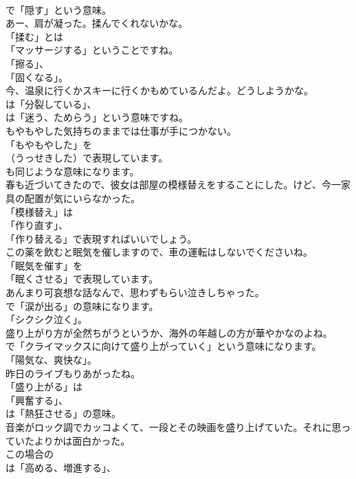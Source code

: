 \documentclass[8pt]{extreport}
\begin{document}
\begin{CJK}{UTF8}{min}
\\	で「隠す」という意味。	
\\	あー、肩が凝った。揉んでくれないかな。 
\\	「揉む」とは
\\	「マッサージする」ということですね。
\\	「擦る」、
\\	「固くなる」。	
\\	今、温泉に行くかスキーに行くかもめているんだよ。どうしようかな。 
\\	は「分裂している」、
\\	は「迷う、ためらう」という意味ですね。	
\\	もやもやした気持ちのままでは仕事が手につかない。 
\\	「もやもやした」を 
\\	（うっせきした）で表現しています。
\\	も同じような意味になります。	
\\	春も近づいてきたので、彼女は部屋の模様替えをすることにした。けど、今一家具の配置が気にいらなかった。 
\\	「模様替え」は
\\	「作り直す」、
\\	「作り替える」で表現すればいいでしょう。	
\\	この薬を飲むと眠気を催しますので、車の運転はしないでくださいね。 
\\	「眠気を催す」を
\\	「眠くさせる」で表現しています。	
\\	あんまり可哀想な話なんで、思わずもらい泣きしちゃった。 
\\	で「涙が出る」の意味になります。
\\	「シクシク泣く」。	
\\	盛り上がり方が全然ちがうというか、海外の年越しの方が華やかなのよね。 
\\	で「クライマックスに向けて盛り上がっていく」という意味になります。
\\	「陽気な、爽快な」。	
\\	昨日のライブもりあがったね。 
\\	「盛り上がる」は
\\	「興奮する」、
\\	は「熱狂させる」の意味。	
\\	音楽がロック調でカッコよくて、一段とその映画を盛り上げていた。それに思っていたよりかは面白かった。 
\\	この場合の 
\\	は「高める、増進する」、

\end{CJK}
\end{document}
